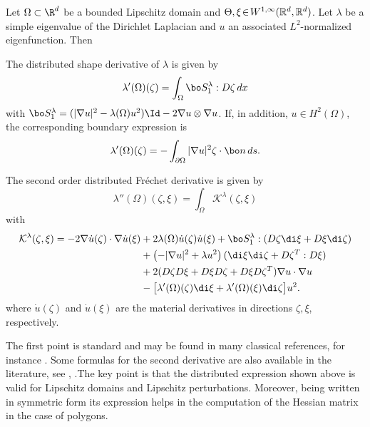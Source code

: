 \begin{thm}\label{thm:sh-deriv-eig}
Let $\Omega\subset \R^d$ be a bounded Lipschitz domain and $\Theta,\xi \!\in\! W^{1,\infty}(\Bbb{R}^d,\Bbb{R}^d)$. Let $\lambda$ be a simple eigenvalue of the Dirichlet Laplacian and $u$ an associated $L^2$\nobreakdash-normalized eigenfunction. Then
\begin{enumeratei}
\item
The distributed shape derivative of $\lambda$ is given by
\[
\lambda'(\Omega)(\zeta) = \int_\Omega \bo S_1^\lambda : D\zeta \, dx
\]
with $\bo S_1^\lambda = (|\nabla u|^2 -\lambda(\Omega) u^2)\Id -2\nabla u \otimes \nabla u$. If, in addition, $u \in H^2(\Omega)$, the corresponding boundary expression is
\[
\lambda'(\Omega)(\zeta) = -\int_{\partial \Omega} |\nabla u|^2\zeta\cdot \bo n\, ds.
\]

\item
The second order distributed Fréchet derivative is given by
\[
\lambda''(\Omega)(\zeta,\xi)= \int_\Omega \mathcal K^\lambda (\zeta,\xi)
\]
with
\begin{align*}
\mathcal K^\lambda(\zeta,\xi)  = -2\nabla \dot u(\zeta)\cdot \nabla \dot u(\xi)&+2\lambda(\Omega)\dot u(\zeta) \dot u(\xi)+ \bo S_1^\lambda: (D\zeta\di \xi+D\xi \di \zeta) \\
& +\left(-|\nabla u|^2+\lambda u^2\right) (\di \xi \di \zeta+D\zeta^T:D\xi)\\
& +2 (D\zeta D\xi+D\xi D\zeta+D\xi D\zeta^T)\nabla u\cdot \nabla u\\
& -\big[\lambda'(\Omega)(\zeta)\di \xi+\lambda'(\Omega)(\xi) \di \zeta \big]u^2 .
\end{align*}
where $\dot u(\zeta)$ and $\dot u(\xi)$ are the material derivatives in directions $\zeta, \xi$, respectively.
\end{enumeratei}
\end{thm}

The first point is standard and may be found in many classical references, for instance \cite{henrot-pierre-english}. Some formulas for the second derivative are also available in the literature, see \cite{henrot-pierre-english}, \cite{HPR04}.The key point is that the distributed expression shown above is valid for Lipschitz domains and Lipschitz perturbations. Moreover, being written in symmetric form its expression helps in the computation of the Hessian matrix in the case of polygons.

